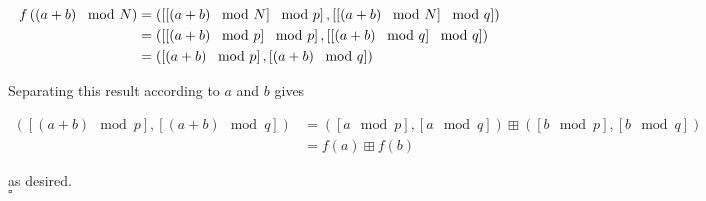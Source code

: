 \documentclass[../CryptoFinal.tex]{subfiles}
\begin{document}
\begin{flushleft}
\begin{align}
  f \left( \left(a + b\right) \mod N \right) &= \left( \left[ \left[ \left(a + b\right) \mod N \right] \mod p \right], \left[ \left[ \left(a + b\right) \mod  N \right] \mod q \right] \right) \notag \\
  &= \left( \left[ \left[ \left(a + b\right) \mod p \right] \mod p \right], \left[ \left[ \left(a + b\right) \mod  q \right] \mod q \right] \right) \notag \\
  &= \left( \left[ \left(a + b\right) \mod p \right], \left[ \left(a + b\right) \mod q \right] \right) \notag
\end{align}

Separating this result according to $a$ and $b$ gives

\begin{align*}
  \left( \left[ \left(a + b\right) \mod p \right], \left[ \left(a + b\right) \mod q \right] \right) &= \left( \left[ a \mod p \right], \left[ a \mod q \right] \right) \boxplus \left( \left[ b \mod p \right], \left[ b \mod q \right] \right) \\
  &= f \left( a \right) \boxplus f \left( b \right)
\end{align*}

as desired. \\
$\square$




\end{flushleft}
\end{document}
